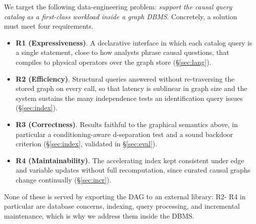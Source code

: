 We target the following data-engineering problem: \emph{support the causal query
catalog as a first-class workload inside a graph DBMS}. Concretely, a solution
must meet four requirements.
\begin{itemize}
  \item \textbf{R1 (Expressiveness)}. A declarative interface in which each catalog query
  is a single statement, close to how analysts phrase causal questions, that
  compiles to physical operators over the graph store (\S\ref{sec:lang}).
  \item \textbf{R2 (Efficiency)}. Structural queries answered without re-traversing the
  stored graph on every call, so that latency is sublinear in graph size and the
  system sustains the many independence tests an identification query issues
  (\S\ref{sec:index}).
  \item \textbf{R3 (Correctness)}. Results faithful to the graphical semantics above,
  in particular a conditioning-aware d-separation test and a sound backdoor
  criterion (\S\ref{sec:index}, validated in \S\ref{sec:eval}).
  \item \textbf{R4 (Maintainability)}. The accelerating index kept consistent under edge
  and variable updates without full recomputation, since curated causal graphs
  change continually (\S\ref{sec:incr}).
\end{itemize}
None of these is served by exporting the DAG to an external library: R2- R4 in
particular are database concerns, indexing, query processing, and incremental
maintenance, which is why we address them inside the DBMS.
